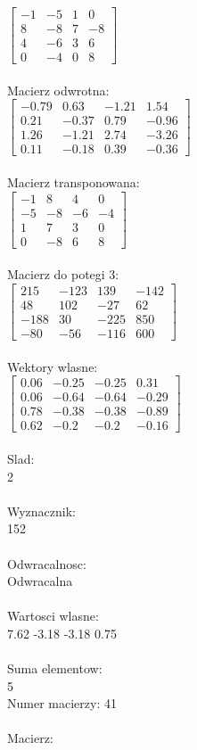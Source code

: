 \documentclass[a4paper,12pt]{article}
\begin{document}
$\begin{bmatrix} -1&-5&1&0\\8&-8&7&-8\\4&-6&3&6\\0&-4&0&8 \end{bmatrix}$
\\
\\
Macierz odwrotna:\\

$\begin{bmatrix} -0.79&0.63&-1.21&1.54\\0.21&-0.37&0.79&-0.96\\1.26&-1.21&2.74&-3.26\\0.11&-0.18&0.39&-0.36 \end{bmatrix}$
\\
\\
Macierz transponowana:\\

$\begin{bmatrix} -1&8&4&0\\-5&-8&-6&-4\\1&7&3&0\\0&-8&6&8 \end{bmatrix}$
\\
\\
Macierz do potegi 3:\\

$\begin{bmatrix} 215&-123&139&-142\\48&102&-27&62\\-188&30&-225&850\\-80&-56&-116&600 \end{bmatrix}$
\\
\\
Wektory wlasne:\\

$\begin{bmatrix} 0.06&-0.25&-0.25&0.31\\0.06&-0.64&-0.64&-0.29\\0.78&-0.38&-0.38&-0.89\\0.62&-0.2&-0.2&-0.16 \end{bmatrix}$
\\
\\
Slad:\\
2
\\
\\
Wyznacznik:\\
152
\\
\\
Odwracalnosc:\\
Odwracalna
\\
\\
Wartosci wlasne:\\
7.62 -3.18 -3.18 0.75
\\
\\
Suma elementow:\\
5
\\
\newpage
Numer macierzy:
41
\\
\\
Macierz:\\
\end{document}
